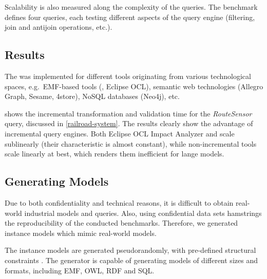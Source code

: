 Scalability is also measured along the complexity of the queries. The benchmark defines four queries, each testing different aspects of the query engine (filtering, join and antijoin operations, etc.).

\subsection{Results}

The \tb{} was implemented for different tools originating from various technological spaces, e.g.\ EMF-based tools (\eiq{}, Eclipse OCL), semantic web technologies (Allegro Graph, Sesame, 4store), NoSQL databases (Neo4j), etc.


 shows the incremental transformation and validation time for the \emph{RouteSensor} query, discussed in \autoref{railroad-system}. The results clearly show the advantage of incremental query engines. Both Eclipse OCL Impact Analyzer and \eiq{} scale sublinearly (their characteristic is almost constant), while non-incremental tools scale linearly at best, which renders them inefficient for lange models.

\subsection{Generating Models}
\label{trainbenchmark-model-generation}

Due to both confidentiality and technical reasons, it is difficult to obtain real-world industrial models and queries. Also, using confidential data sets hamstrings the reproducibility of the conducted benchmarks. Therefore, we generated instance models which mimic real-world models.

The instance models are generated pseudorandomly, with pre-defined structural constraints \cite{ASE2013}. The generator is capable of generating models of different sizes and formats, including EMF, OWL, RDF and SQL. 
